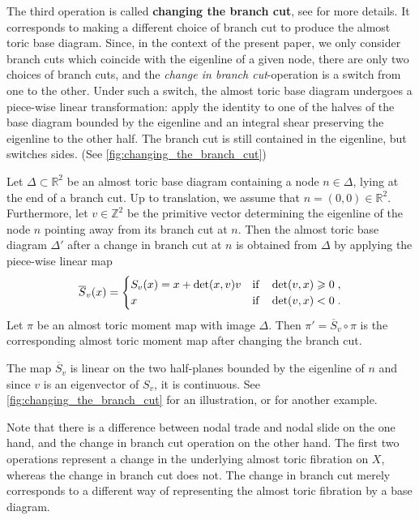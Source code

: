 \documentclass[12pt,a4paper,abstract=true,final]{scrartcl}
\begin{document}
The third operation is called \textbf{changing the branch cut}, see \cite[Sections 8.4]{evans2021atfs} for more details.
It corresponds to making a different choice of branch cut to produce the almost toric base diagram.
Since, in the context of the present paper, we only consider branch cuts which coincide with the eigenline of a given node, there are only two choices of branch cuts, and the \textit{change in branch cut}-operation is a switch from one to the other.
Under such a switch, the almost toric base diagram undergoes a piece-wise linear transformation: apply the identity to one of the halves of the base diagram bounded by the eigenline and an integral shear preserving the eigenline to the other half.
The branch cut is still contained in the eigenline, but switches sides. (See \cref{fig:changing_the_branch_cut})

\begin{proposition}
    \label{thm:change_branchcut}
    Let $\Delta \subset \mathbb{R}^2$ be an almost toric base diagram containing a node $n \in \Delta$, lying at the end of a branch cut.
Up to translation, we assume that $n = (0,0) \in \mathbb{R}^2$.
Furthermore, let $v \in \mathbb{Z}^2$ be the primitive vector determining the eigenline of the node $n$ pointing away from its branch cut at $n$.
Then the almost toric base diagram $\Delta'$ after a change in branch cut at $n$ is obtained from $\Delta$ by applying the piece-wise linear map 
    \begin{equation}
    \label{eq:half-shear}
        \overline{S}_v(x) =
        \begin{cases}
            S_v(x) = x + \det(x,v)v & \qif* \det(v,x) \geqslant 0 \;, \\
            x & \qif* \det(v,x) < 0 \;.
        \end{cases}
    \end{equation}
    Let $\pi$ be an almost toric moment map with image $\Delta$.
Then $\pi' = \overline{S}_v \circ \pi$ is the corresponding almost toric moment map after changing the branch cut.
\end{proposition}

The map $\overline{S}_v$ is linear on the two half-planes bounded by the eigenline of $n$ and since $v$ is an eigenvector of $S_v$, it is continuous.
See \cref{fig:changing_the_branch_cut} for an illustration, or \cite[Example 8.15]{evans2021atfs} for another example.

Note that there is a difference between nodal trade and nodal slide on the one hand, and the change in branch cut operation on the other hand.
The first two operations represent a change in the underlying almost toric fibration on $X$, whereas the change in branch cut does not.
The change in branch cut merely corresponds to a different way of representing the almost toric fibration by a base diagram.
\end{document}
